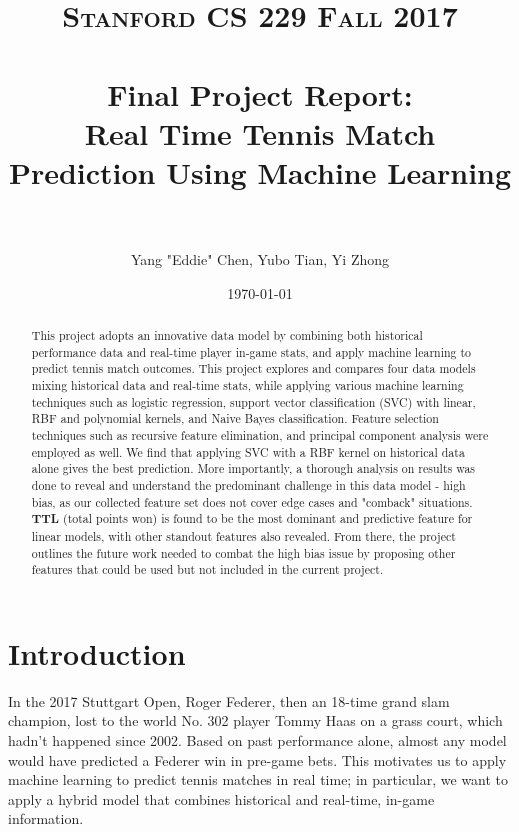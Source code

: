 \documentclass[paper=a4, fontsize=10pt]{scrartcl} %
\title{	
\normalfont \normalsize 
\textsc{Stanford CS 229 Fall 2017} \\ [20pt] %
\horrule{0.5pt} \\[0.4cm] %
\Large Final Project Report: \\
\Large Real Time Tennis Match Prediction Using Machine Learning\\ %
\horrule{2pt} \\[0.5cm] %
}
\author{Yang "Eddie" Chen, Yubo Tian, Yi Zhong} %
\date{\normalsize\today} %
\numberwithin{equation}{section} %
\numberwithin{figure}{section} %
\numberwithin{table}{section} %
\begin{document}
\twocolumn[
\maketitle %
]
\begin{abstract}
This project adopts an innovative data model by combining both historical performance data and real-time player in-game stats, and apply machine learning to predict tennis match outcomes. This project explores and compares four data models mixing historical data and real-time stats, while applying various machine learning techniques such as logistic regression, support vector classification (SVC) with linear, RBF and polynomial kernels, and Naive Bayes classification. Feature selection techniques such as recursive feature elimination, and principal component analysis were employed as well. We find that applying SVC with a RBF kernel on historical data alone gives the best prediction. More importantly, a thorough analysis on results was done to reveal and understand the predominant challenge in this data model - high bias, as our collected feature set does not cover edge cases and "comback" situations. \textbf{TTL} (total points won) is found to be the most dominant and predictive feature for linear models, with other standout features also revealed. From there, the project outlines the future work needed to combat the high bias issue by proposing other features that could be used but not included in the current project. 
\end{abstract}

\section{Introduction}
In the 2017 Stuttgart Open, Roger Federer, then an 18-time grand slam champion, lost to the world No. 302 player Tommy Haas on a grass court, which hadn't happened since 2002.  Based on past performance alone, almost any model would have predicted a Federer win in pre-game bets. This motivates us to apply machine learning to predict tennis matches in real time; in particular, we want to apply a hybrid model that combines historical and real-time, in-game information.
\end{document}
